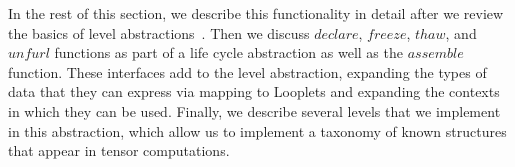 In the rest of this section, we describe this functionality in detail after we review the basics of level abstractions~\cite{sze2017efficient,chou2022compilation, chou2018format}.
%
Then we discuss $declare$, $freeze$, $thaw$, and $unfurl$ functions as part of a life cycle abstraction as well as the $assemble$ function.
%
These interfaces add to the level abstraction, expanding the types of data that they can express via mapping to Looplets and expanding the contexts in which they can be used.
%
Finally, we describe several levels that we implement in this abstraction, which allow us to implement a taxonomy of known structures that appear in tensor computations.




